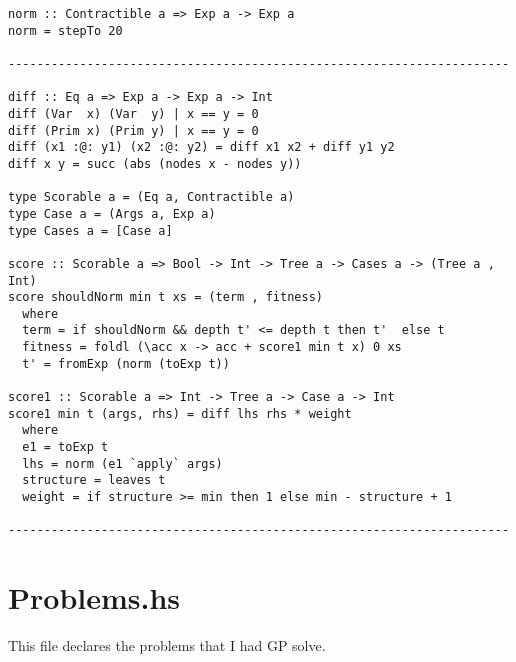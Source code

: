 \documentclass{article}
\begin{document}
\begin{lstlisting}
norm :: Contractible a => Exp a -> Exp a
norm = stepTo 20

----------------------------------------------------------------------

diff :: Eq a => Exp a -> Exp a -> Int
diff (Var  x) (Var  y) | x == y = 0
diff (Prim x) (Prim y) | x == y = 0
diff (x1 :@: y1) (x2 :@: y2) = diff x1 x2 + diff y1 y2
diff x y = succ (abs (nodes x - nodes y))

type Scorable a = (Eq a, Contractible a)
type Case a = (Args a, Exp a)
type Cases a = [Case a]

score :: Scorable a => Bool -> Int -> Tree a -> Cases a -> (Tree a , Int)
score shouldNorm min t xs = (term , fitness)
  where
  term = if shouldNorm && depth t' <= depth t then t'  else t
  fitness = foldl (\acc x -> acc + score1 min t x) 0 xs
  t' = fromExp (norm (toExp t))

score1 :: Scorable a => Int -> Tree a -> Case a -> Int
score1 min t (args, rhs) = diff lhs rhs * weight
  where
  e1 = toExp t
  lhs = norm (e1 `apply` args)
  structure = leaves t
  weight = if structure >= min then 1 else min - structure + 1

----------------------------------------------------------------------
\end{lstlisting}

\section{Problems.hs}

This file declares the problems that I had GP solve.
\end{document}
